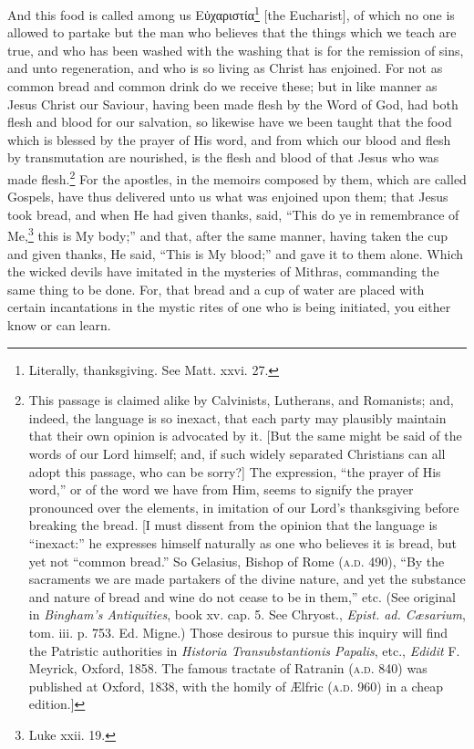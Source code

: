 And this food is called among us \textgreek{Εὐχαριστία}\footnote{Literally, thanksgiving. See Matt. xxvi. 27.} [the Eucharist], of which no one is allowed to partake but the man who believes that the things which we teach are true, and who has been washed with the washing that is for the remission of sins, and unto regeneration, and who is so living as Christ has enjoined. For not as common bread and common drink do we receive these; but in like manner as Jesus Christ our Saviour, having been made flesh by the Word of God, had both flesh and blood for our salvation, so likewise have we been taught that the food which is blessed by the prayer of His word, and from which our blood and flesh by transmutation are nourished, is the flesh and blood of that Jesus who was made flesh.\footnote{This passage is claimed alike by Calvinists, Lutherans, and Romanists; and, indeed, the language is so inexact, that each party may plausibly maintain that their own opinion is advocated by it. [But the same might be said of the words of our Lord himself; and, if such widely separated Christians can all adopt this passage, who can be sorry?] The expression, “the prayer of His word,” or of the word we have from Him, seems to signify the prayer pronounced over the elements, in imitation of our Lord’s thanksgiving before breaking the bread. [I must dissent from the opinion that the language is “inexact:” he expresses himself naturally as one who believes it is bread, but yet not “common bread.” So Gelasius, Bishop of Rome (\textsc{a.d.} 490), “By the sacraments we are made partakers of the divine nature, and yet the substance and nature of bread and wine do not cease to be in them,” etc. (See original in \emph{Bingham’s Antiquities}, book xv. cap. 5. See Chryost., \emph{Epist. ad. Cæsarium}, tom. iii. p. 753. Ed. Migne.) Those desirous to pursue this inquiry will find the Patristic authorities in \emph{Historia Transubstantionis Papalis}, etc., \emph{Edidit} F. Meyrick, Oxford, 1858. The famous tractate of Ratranin (\textsc{a.d.} 840) was published at Oxford, 1838, with the homily of Ælfric (\textsc{a.d.} 960) in a cheap edition.]} For the apostles, in the memoirs composed by them, which are called Gospels, have thus delivered unto us what was enjoined upon them; that Jesus took bread, and when He had given thanks, said, “This do ye in remembrance of Me,\footnote{Luke xxii. 19.} this is My body;” and that, after the same manner, having taken the cup and given thanks, He said, “This is My blood;” and gave it to them alone. Which the wicked devils have imitated in the mysteries of Mithras, commanding the same thing to be done. For, that bread and a cup of water are placed with certain incantations in the mystic rites of one who is being initiated, you either know or can learn.

